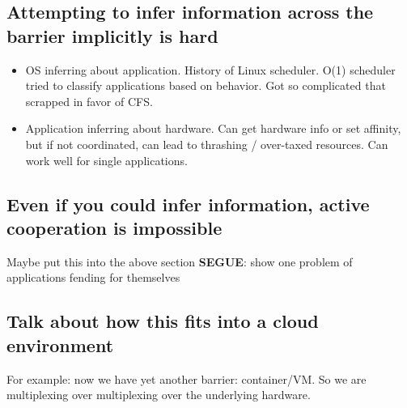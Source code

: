 \subsection{Attempting to infer information across the barrier implicitly is hard}
\begin{itemize}
\item OS inferring about application. History of Linux scheduler. O(1) scheduler tried to classify applications based on behavior. Got so complicated that scrapped in favor of CFS.
\item Application inferring about hardware. Can get hardware info or set affinity, but if not coordinated, can lead to thrashing / over-taxed resources. Can work well for single applications. \cite{reinders2007intel}\cite{hellerstein2008optimizing}
\end{itemize}
\subsection{Even if you could infer information, active cooperation is impossible}
Maybe put this into the above section
\textbf{SEGUE}: show one problem of applications fending for themselves
\subsection{Talk about how this fits into a cloud environment}
For example: now we have yet another barrier: container/VM. So we are multiplexing over multiplexing over the underlying hardware.
